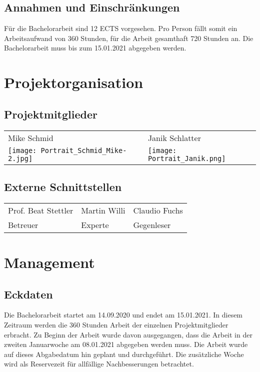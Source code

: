 \subsection*{Annahmen und Einschränkungen}
Für die Bachelorarbeit sind 12 ECTS vorgesehen. 
Pro Person fällt somit ein Arbeitsaufwand von 360 Stunden, 
für die Arbeit gesamthaft 720 Stunden an.
Die Bachelorarbeit muss bis zum 15.01.2021 abgegeben werden.

\clearpage

\section{Projektorganisation 
\label{Projektorganisation}}

\subsection*{Projektmitglieder}
\begin{table}[H]
	\centering
	\begin{tabularx}{\linewidth}{X X}
		Mike Schmid & Janik Schlatter \\
		\texttt{[image: Portrait\_Schmid\_Mike-2.jpg]}
		&
		\texttt{[image: Portrait\_Janik.png]}
	\end{tabularx} 
\end{table}

\subsection*{Externe Schnittstellen}
\begin{table}[H]
	\centering
	\begin{tabularx}{\linewidth}{| X | X | X |}
		\hline
		Prof. Beat Stettler & Martin Willi & Claudio Fuchs \\
		Betreuer & Experte & Gegenleser\\
		\hline
	\end{tabularx} 
\end{table}

\clearpage

\section{Management 
\label{Management}} 

\subsection*{Eckdaten}
Die Bachelorarbeit startet am 14.09.2020 und endet am 15.01.2021. 
In diesem Zeitraum werden die 360 Stunden Arbeit der einzelnen 
Projektmitglieder erbracht.
Zu Beginn der Arbeit wurde davon ausgegangen, dass die Arbeit in der 
zweiten Januarwoche am 08.01.2021 abgegeben werden muss. 
Die Arbeit wurde auf dieses Abgabedatum hin geplant und durchgeführt.
Die zusätzliche Woche wird als Reservezeit für allfällige Nachbesserungen 
betrachtet.

